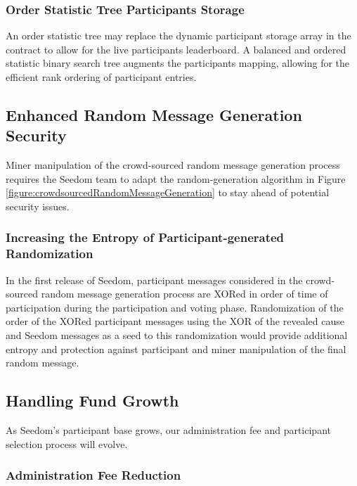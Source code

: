 \documentclass[11pt]{article}
\begin{document}
\subsubsection{Order Statistic Tree Participants Storage}

An order statistic tree \cite{5} may replace the dynamic participant storage array in the contract to allow for the live participants leaderboard. A balanced and ordered statistic binary search tree augments the participants mapping, allowing for the efficient rank ordering of participant entries.

\subsection{Enhanced Random Message Generation Security}

Miner manipulation of the crowd-sourced random message generation process requires the Seedom team to adapt the random-generation algorithm in Figure \ref{figure:crowdsourcedRandomMessageGeneration} to stay ahead of potential security issues.

\subsubsection{Increasing the Entropy of Participant-generated Randomization}
\label{sec:increasingTheEntropyOfParticipantGeneratedRandomization}

In the first release of Seedom, participant messages considered in the crowd-sourced random message generation process are XORed in order of time of participation during the participation and voting phase. Randomization of the order of the XORed participant messages using the XOR of the revealed cause and Seedom messages as a seed to this randomization would provide additional entropy and protection against participant and miner manipulation of the final random message.

\subsection{Handling Fund Growth}

As Seedom's participant base grows, our administration fee and participant selection process will evolve.

\subsubsection{Administration Fee Reduction}
\end{document}
